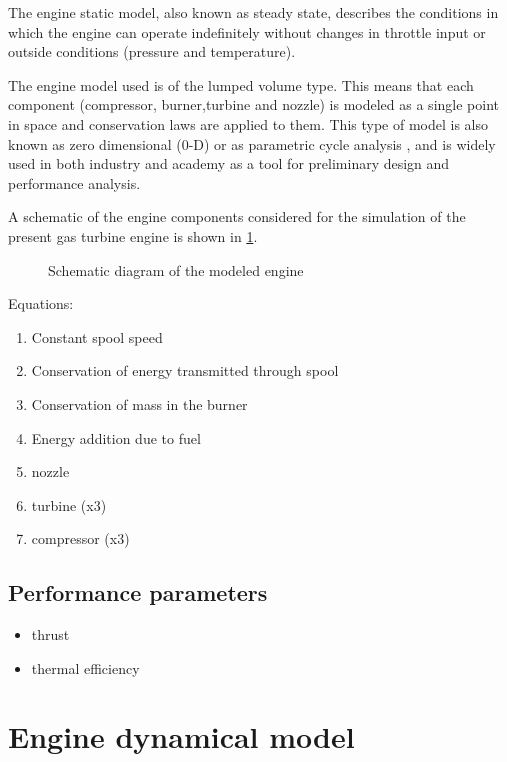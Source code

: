 \documentclass[tcc]{subfiles}
\begin{document}
The engine static model, also known as steady state, 
describes the conditions in which the engine can operate indefinitely 
without changes in throttle input or outside conditions (pressure and temperature).

The engine model used is of the lumped volume type. This means that each component 
 (compressor, burner,turbine and nozzle)
 is modeled as a single point in space and conservation laws are applied to them.
 This type of model is also known as zero dimensional (0-D) or as parametric cycle analysis
 ,
 and is widely used in both industry and academy as a tool for preliminary design and 
 performance analysis. 

A schematic of the engine components considered for the simulation of the present gas turbine engine is shown in \cref{fig:engine}.

\begin{figure}
    \caption{Schematic diagram of the modeled engine}
    \label{fig:engine}
    
    \source{\authorsfigure}
\end{figure}

Equations:
\begin{enumerate}
    \item Constant spool speed
    \item Conservation of energy transmitted through spool
    \item Conservation of mass in the burner
    \item Energy addition due to fuel
    \item nozzle
    \item turbine (x3)
    \item compressor (x3)
\end{enumerate}



\subsection{Performance parameters}
\begin{itemize}
    \item thrust
    \item thermal efficiency
\end{itemize}

\section{Engine dynamical model}
\end{document}
